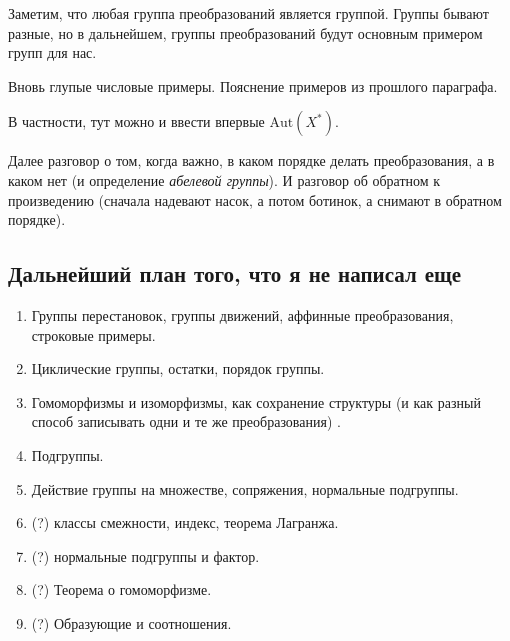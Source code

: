 	\begin{remark}
		Заметим, что любая группа преобразований является группой. Группы бывают разные, но в дальнейшем, группы преобразований будут основным примером групп для нас. 
	\end{remark}

	\begin{example}
		Вновь глупые числовые примеры. Пояснение примеров из прошлого параграфа. 
	\end{example}

	\begin{example}
		В частности, тут можно и ввести впервые $\mathrm{Aut}(X^*)$.
	\end{example}


	Далее разговор о том, когда важно, в каком порядке делать преобразования, а в каком нет (и определение \emph{абелевой группы}). И разговор об обратном к произведению (сначала надевают насок, а потом ботинок, а снимают в обратном порядке). 

	

	\subsection{Дальнейший план того, что я не написал еще}

	\begin{enumerate}
		\item Группы перестановок, группы движений, аффинные преобразования, строковые примеры.  
		\item Циклические группы, остатки, порядок группы. 
		\item Гомоморфизмы и изоморфизмы, как сохранение структуры (и как разный способ записывать одни и те же преобразования) . 
		\item Подгруппы.
		\item Действие группы на множестве, сопряжения, нормальные подгруппы. 

		\item (?) классы смежности, индекс, теорема Лагранжа. 
		\item (?) нормальные подгруппы и фактор. 
		\item (?) Теорема о гомоморфизме. 
		\item (?) Образующие и соотношения. 
	\end{enumerate}



